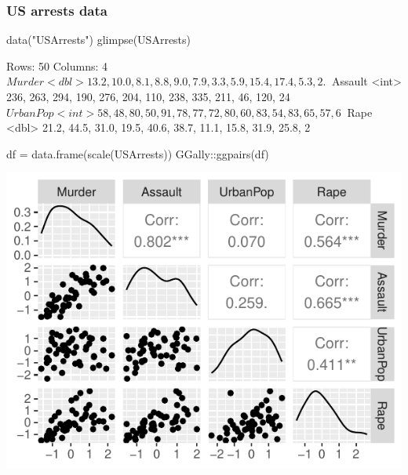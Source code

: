 \documentclass[a4paper]{article}\usepackage[]{graphicx}\usepackage[]{xcolor}
\makeatletter
\def\maxwidth{ %
  \ifdim\Gin@nat@width>\linewidth
    \linewidth
  \else
    \Gin@nat@width
  \fi
}
\makeatother
\begin{document}
\subsubsection{US arrests data}
\begin{Schunk}
\begin{Sinput}
data("USArrests")
glimpse(USArrests)
\end{Sinput}
\begin{Soutput}
Rows: 50
Columns: 4
$ Murder   <dbl> 13.2, 10.0, 8.1, 8.8, 9.0, 7.9, 3.3, 5.9, 15.4, 17.4, 5.3, 2.~
$ Assault  <int> 236, 263, 294, 190, 276, 204, 110, 238, 335, 211, 46, 120, 24~
$ UrbanPop <int> 58, 48, 80, 50, 91, 78, 77, 72, 80, 60, 83, 54, 83, 65, 57, 6~
$ Rape     <dbl> 21.2, 44.5, 31.0, 19.5, 40.6, 38.7, 11.1, 15.8, 31.9, 25.8, 2~
\end{Soutput}
\begin{Sinput}
df = data.frame(scale(USArrests))
GGally::ggpairs(df)
\end{Sinput}


{\centering \includegraphics[width=\maxwidth]{figure/listings-unnamed-chunk-495-1} 

}

\end{Schunk}
\end{document}
